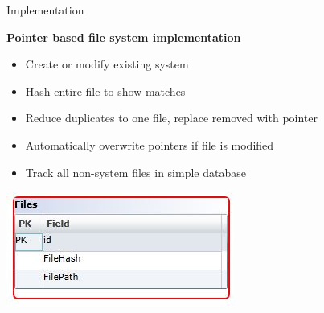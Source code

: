 \begin{frame}[t]{Implementation}

  \hspace*{.6in}
  \begin{minipage}{3.5in}
  \begin{center}

	\textbf{Pointer based file system implementation}
	\begin{itemize}
	\renewcommand{\labelitemi}{$\bullet$}
		\item Create or modify existing system
		\item Hash entire file to show matches
		\item Reduce duplicates to one file, replace removed with pointer
		\item Automatically overwrite pointers if file is modified
		\item Track all non-system files in simple database
	\end{itemize}	  
	  
	\includegraphics[scale=.7]{schema.JPG}

  \end{center}
  \end{minipage}

\end{frame}